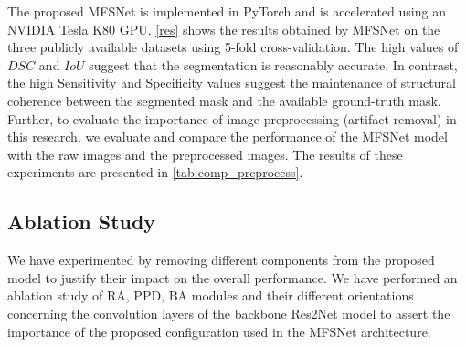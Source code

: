 \documentclass[review]{elsarticle}
\begin{document}
\begin{table*}[]
\centering
\caption{Comparison of the results obtained with the MFSNet model on the three datasets with and without image preprocessing}
\label{tab:comp_preprocess}
\end{table*}

The proposed MFSNet is implemented in PyTorch and is accelerated using an NVIDIA Tesla K80 GPU. \autoref{res} shows the results obtained by MFSNet on the three publicly available datasets using 5-fold cross-validation. The high values of $DSC$ and $IoU$ suggest that the segmentation is reasonably accurate. In contrast, the high Sensitivity and Specificity values suggest the maintenance of structural coherence between the segmented mask and the available ground-truth mask. Further, to evaluate the importance of image preprocessing (artifact removal) in this research, we evaluate and compare the performance of the MFSNet model with the raw images and the preprocessed images. The results of these experiments are presented in \autoref{tab:comp_preprocess}.

\subsection{Ablation Study}\label{ablation}
We have experimented by removing different components from the proposed model to justify their impact on the overall performance. We have performed an ablation study of RA, PPD, BA modules and their different orientations concerning the convolution layers of the backbone Res2Net model to assert the importance of the proposed configuration used in the MFSNet architecture.
\end{document}
